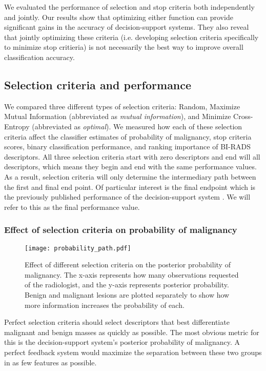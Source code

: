 We evaluated the performance of selection and stop criteria both independently and jointly. Our results show that optimizing either function can provide significant gains in the accuracy of decision-support systems. They also reveal that jointly optimizing these criteria (i.e. developing selection criteria specifically to minimize stop critieria) is not necessarily the best way to improve overall classification accuracy.

\subsection{Selection criteria and performance}
We compared three different types of selection criteria: Random, Maximize Mutual Information (abbreviated as \emph{mutual information}), and Minimize Cross-Entropy (abbreviated as \emph{optimal}). We measured how each of these selection criteria affect the classifier estimates of probability of malignancy, stop criteria scores, binary classification performance, and ranking importance of BI-RADS descriptors. 
All three selection criteria start with zero descriptors and end will all descriptors, which means they begin and end with the same performance values. As a result, selection criteria will only determine the intermediary path between the first and final end point. Of particular interest is the final endpoint which is the previously published performance of the decision-support system \cite{Gimenez:2014tr,Burnside:2009br}. We will refer to this as the final performance value.

\subsubsection{Effect of selection criteria on probability of malignancy}

\begin{figure}[h]
	\centering
	\texttt{[image: probability\_path.pdf]}
	\caption[Effect of selection criteria on probability of malignancy]{Effect of different selection criteria on the posterior probability of malignancy. The x-axis represents how many observations requested of the radiologist, and the y-axis represents posterior probability. Benign and malignant lesions are plotted separately to show how more information increases the probability of each. }
	\label{fig:feedback_mammo}
\end{figure}


Perfect selection criteria should select descriptors that best differentiate malignant and benign masses as quickly as possible. The most obvious metric for this is the decision-support system's posterior probability of malignancy.  A perfect feedback system would maximize the separation between these two groups in as few features as possible.

